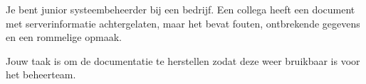 Je bent junior systeembeheerder bij een bedrijf. Een collega heeft een document met serverinformatie achtergelaten, maar het bevat fouten, ontbrekende gegevens en een rommelige opmaak.

Jouw taak is om de documentatie te herstellen zodat deze weer bruikbaar is voor het beheerteam.

